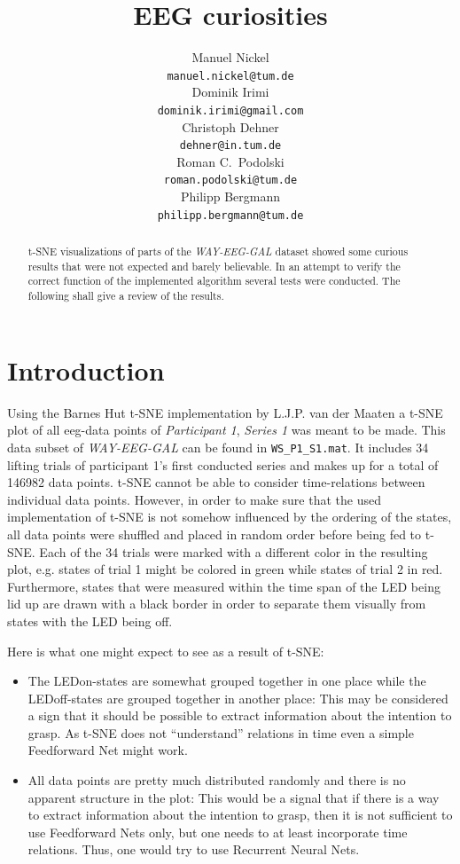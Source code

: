 \documentclass{article} %
\title{EEG curiosities}
\author{
Manuel Nickel
\\
\texttt{manuel.nickel@tum.de} \\
\And
Dominik Irimi \\
\texttt{dominik.irimi@gmail.com} \\
\AND
Christoph Dehner \\
\texttt{dehner@in.tum.de} \\
\And
Roman C.~Podolski \\
\texttt{roman.podolski@tum.de} \\
\And
Philipp Bergmann \\
\texttt{philipp.bergmann@tum.de} \\
}
\begin{document}
\maketitle

\begin{abstract}
t-SNE visualizations of parts of the \emph{WAY-EEG-GAL} dataset showed some curious results that were not expected and barely believable. In an attempt to verify the correct function of the implemented algorithm several tests were conducted. The following shall give a review of the results.
\end{abstract}

\section{Introduction}
Using the Barnes Hut t-SNE implementation by L.J.P. van der Maaten a t-SNE plot of all eeg-data points of \emph{Participant 1}, \emph{Series 1} was meant to be made. This data subset of \emph{WAY-EEG-GAL} can be found in \verb|WS_P1_S1.mat|. It includes 34 lifting trials of participant 1's first conducted series and makes up for a total of 146982 data points. t-SNE cannot be able to consider time-relations between individual data points. However, in order to make sure that the used implementation of t-SNE is not somehow influenced by the ordering of the states, all data points were shuffled and placed in random order before being fed to t-SNE. Each of the 34 trials were marked with a different color in the resulting plot, e.g. states of trial 1 might be colored in green while states of trial 2 in red. Furthermore, states that were measured within the time span of the LED being lid up are drawn with a black border in order to separate them visually from states with the LED being off.

Here is what one might expect to see as a result of t-SNE:
\begin{itemize}
	\item The LEDon-states are somewhat grouped together in one place while the LEDoff-states are grouped together in another place:
	This may be considered a sign that it should be possible to extract information about the intention to grasp. As t-SNE does not ``understand'' relations in time even a simple Feedforward Net might work.
	\item All data points are pretty much distributed randomly and there is no apparent structure in the plot:
	This would be a signal that if there is a way to extract information about the intention to grasp, then it is not sufficient to use Feedforward Nets only, but one needs to at least incorporate time relations. Thus, one would try to use Recurrent Neural Nets.
\end{itemize}
\end{document}
